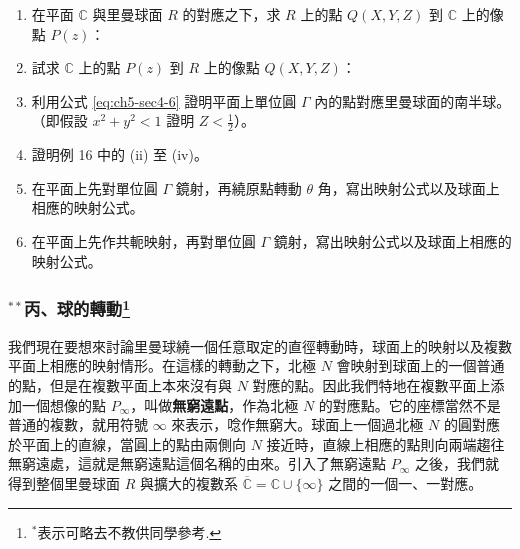\begin{enumerate}
  \item 在平面 $\mathbb{C}$ 與里曼球面 $R$ 的對應之下，求 $R$ 上的點 $Q(X, Y, Z)$ 到 $\mathbb{C}$ 上的像點 $P(z)$：
  \begin{enumerate}[(i)]
  \end{enumerate}
  \item 試求 $\mathbb{C}$ 上的點 $P(z)$ 到 $R$ 上的像點 $Q(X, Y, Z)$：
  \begin{enumerate}[(i)]
  \end{enumerate}
  \item 利用公式 \eqref{eq:ch5-sec4-6} 證明平面上單位圓 $\Gamma$ 內的點對應里曼球面的南半球。（即假設 $x^2+y^2 < 1$ 證明 $Z < \frac{1}{2}$）。
  \item[$^*$\theenumi.] 證明例 16 中的 (ii) 至 (iv)。
  \item[$^*$\theenumi.] 在平面上先對單位圓 $\Gamma$ 鏡射，再繞原點轉動 $\theta$ 角，寫出映射公式以及球面上相應的映射公式。
  \item[$^*$\theenumi.] 在平面上先作共軛映射，再對單位圓 $\Gamma$ 鏡射，寫出映射公式以及球面上相應的映射公式。
\end{enumerate}

\subsubsection*{$^{**}$丙、球的轉動\footnote{$^*$表示可略去不教供同學參考.}}

我們現在要想來討論里曼球繞一個任意取定的直徑轉動時，球面上的映射以及複數平面上相應的映射情形。在這樣的轉動之下，北極 $N$ 會映射到球面上的一個普通的點，但是在複數平面上本來沒有與 $N$ 對應的點。因此我們特地在複數平面上添加一個想像的點 $P_\infty$，叫做\textbf{無窮遠點}，作為北極 $N$ 的對應點。它的座標當然不是普通的複數，就用符號 $\infty$ 來表示，唸作無窮大。球面上一個過北極 $N$ 的圓對應於平面上的直線，當圓上的點由兩側向 $N$ 接近時，直線上相應的點則向兩端趨往無窮遠處，這就是無窮遠點這個名稱的由來。引入了無窮遠點 $P_\infty$ 之後，我們就得到整個里曼球面 $R$ 與擴大的複數系 $\overline{\mathbb{C}} = \mathbb{C} \cup \{\infty\}$ 之間的一個一、一對應。

